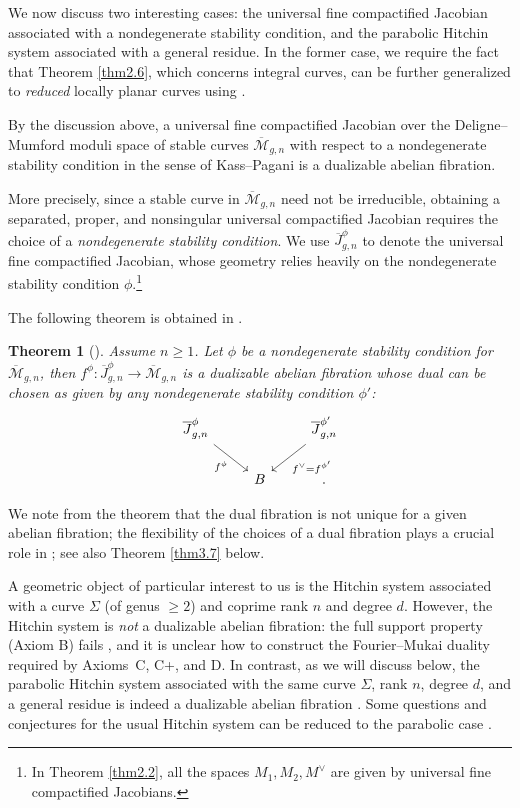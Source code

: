 \documentclass[11pt]{amsart}
\theoremstyle{plain}
\newtheorem{thm}{Theorem}[section]
\theoremstyle{definition}
\theoremstyle{remark}
\newcommand{\CM}{{\mathcal M}}
\begin{document}
We now discuss two interesting cases: the universal fine compactified Jacobian associated with a nondegenerate stability condition, and the parabolic Hitchin system associated with a general residue.  In the former case, we require the fact that Theorem \ref{thm2.6}, which concerns integral curves, can be further generalized to \emph{reduced} locally planar curves using \cite{MSY, MRV2}. 

\medskip

 By the discussion above, a universal fine compactified Jacobian over the Deligne--Mumford moduli space of stable curves $\overline{\CM}_{g,n}$ with respect to a nondegenerate stability condition in the sense of Kass--Pagani \cite{KP} is a dualizable abelian fibration.


More precisely, since a stable curve in $\overline{\CM}_{g,n}$ need not be irreducible, obtaining a separated, proper, and nonsingular universal compactified Jacobian requires the choice of a \emph{nondegenerate stability condition}. We use $\overline{J}^{\phi}_{g,n}$ to denote the universal fine compactified Jacobian, whose geometry relies heavily on the nondegenerate stability condition $\phi$.\footnote{In Theorem \ref{thm2.2}, all the spaces $M_1,M_2,M^\vee$ are given by universal fine compactified Jacobians.} 

The following theorem is obtained in \cite[Theorem 2.13]{MSY}.

\begin{thm}[\cite{BMSY2}] \label{thm2.8}
Assume $n\geq 1$. Let $\phi$ be a nondegenerate stability condition for $\overline{\CM}_{g,n}$, then $f^\phi: \overline{J}^\phi_{g,n} \to \overline{\CM}_{g,n}$ is a dualizable abelian fibration whose dual can be chosen as given by any nondegenerate stability condition $\phi'$:
\[
\begin{tikzcd}
\overline{J}^\phi_{g,n} \arrow[dr, "f^\phi"'] & & \overline{J}^{\phi'}_{g,n} \arrow[dl, "f^\vee = f^{\phi'}"] \\
& B &.
\end{tikzcd}
\]
\end{thm}

We note from the theorem that the dual fibration is not unique for a given abelian fibration; the flexibility of the choices of a dual fibration plays a crucial role in \cite{BMSY2}; see also Theorem \ref{thm3.7} below.


\medskip

 A geometric object of particular interest to us is the Hitchin system associated with a curve $\Sigma$ (of genus $\geq 2$) and coprime rank $n$ and degree $d$. However, the Hitchin system is \emph{not} a dualizable abelian fibration: the full support property (Axiom B) fails \cite{dCHeM}, and it is unclear how to construct the Fourier–Mukai duality required by Axioms~C, C+, and D. In contrast, as we will discuss below, the parabolic Hitchin system associated with the same curve $\Sigma$, rank $n$, degree $d$, and a general residue is indeed a dualizable abelian fibration \cite{MSY2}. Some questions and conjectures for the usual Hitchin system can be reduced to the parabolic case \cite{HMMS, MSY2}.
\end{document}
